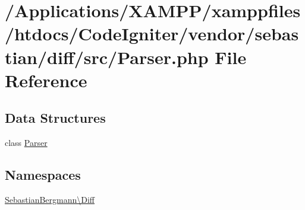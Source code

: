 \hypertarget{vendor_2sebastian_2diff_2src_2_parser_8php}{}\section{/\+Applications/\+X\+A\+M\+P\+P/xamppfiles/htdocs/\+Code\+Igniter/vendor/sebastian/diff/src/\+Parser.php File Reference}
\label{vendor_2sebastian_2diff_2src_2_parser_8php}
\subsection*{Data Structures}
\begin{DoxyCompactItemize}
\item 
class \mbox{\hyperlink{class_sebastian_bergmann_1_1_diff_1_1_parser}{Parser}}
\end{DoxyCompactItemize}
\subsection*{Namespaces}
\begin{DoxyCompactItemize}
\item 
 \mbox{\hyperlink{namespace_sebastian_bergmann_1_1_diff}{Sebastian\+Bergmann\textbackslash{}\+Diff}}
\end{DoxyCompactItemize}
